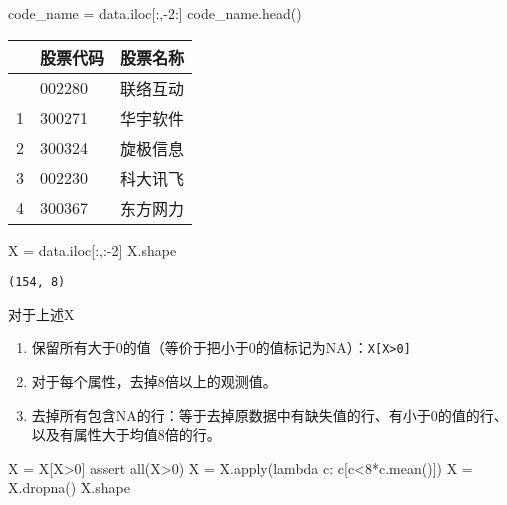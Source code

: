 \documentclass[
  letterpaper,
  DIV=11,
  numbers=noendperiod]{scrreprt}
\newenvironment{Shaded}{\begin{snugshade}}{\end{snugshade}}
\newcommand{\BuiltInTok}[1]{\textcolor[rgb]{0.00,0.23,0.31}{#1}}
\newcommand{\ControlFlowTok}[1]{\textcolor[rgb]{0.00,0.23,0.31}{#1}}
\newcommand{\DecValTok}[1]{\textcolor[rgb]{0.68,0.00,0.00}{#1}}
\newcommand{\KeywordTok}[1]{\textcolor[rgb]{0.00,0.23,0.31}{#1}}
\newcommand{\NormalTok}[1]{\textcolor[rgb]{0.00,0.23,0.31}{#1}}
\newcommand{\OperatorTok}[1]{\textcolor[rgb]{0.37,0.37,0.37}{#1}}
\providecommand{\tightlist}{%
  \setlength{\itemsep}{0pt}\setlength{\parskip}{0pt}}\usepackage{longtable,booktabs,array}
\begin{document}
\begin{Shaded}
\begin{Highlighting}[]
\NormalTok{code\_name }\OperatorTok{=}\NormalTok{ data.iloc[:,}\OperatorTok{{-}}\DecValTok{2}\NormalTok{:]}
\NormalTok{code\_name.head()}
\end{Highlighting}
\end{Shaded}

\begin{longtable}[]{@{}lll@{}}
\toprule\noalign{}
& 股票代码 & 股票名称 \\
\midrule\noalign{}
\endhead
\bottomrule\noalign{}
\endlastfoot
0 & 002280 & 联络互动 \\
1 & 300271 & 华宇软件 \\
2 & 300324 & 旋极信息 \\
3 & 002230 & 科大讯飞 \\
4 & 300367 & 东方网力 \\
\end{longtable}

\begin{Shaded}
\begin{Highlighting}[]
\NormalTok{X }\OperatorTok{=}\NormalTok{ data.iloc[:,:}\OperatorTok{{-}}\DecValTok{2}\NormalTok{]}
\NormalTok{X.shape}
\end{Highlighting}
\end{Shaded}

\begin{verbatim}
(154, 8)
\end{verbatim}

对于上述X

\begin{enumerate}
\def\labelenumi{\arabic{enumi}.}
\tightlist
\item
  保留所有大于0的值（等价于把小于0的值标记为NA）：\texttt{X{[}X\textgreater{}0{]}}
\item
  对于每个属性，去掉8倍以上的观测值。
\item
  去掉所有包含NA的行：等于去掉原数据中有缺失值的行、有小于0的值的行、以及有属性大于均值8倍的行。
\end{enumerate}

\begin{Shaded}
\begin{Highlighting}[]
\NormalTok{X }\OperatorTok{=}\NormalTok{ X[X}\OperatorTok{\textgreater{}}\DecValTok{0}\NormalTok{]}
\ControlFlowTok{assert} \BuiltInTok{all}\NormalTok{(X}\OperatorTok{\textgreater{}}\DecValTok{0}\NormalTok{)}
\NormalTok{X }\OperatorTok{=}\NormalTok{ X.}\BuiltInTok{apply}\NormalTok{(}\KeywordTok{lambda}\NormalTok{ c: c[c}\OperatorTok{\textless{}}\DecValTok{8}\OperatorTok{*}\NormalTok{c.mean()])}
\NormalTok{X }\OperatorTok{=}\NormalTok{ X.dropna()}
\NormalTok{X.shape}
\end{Highlighting}
\end{Shaded}
\end{document}
